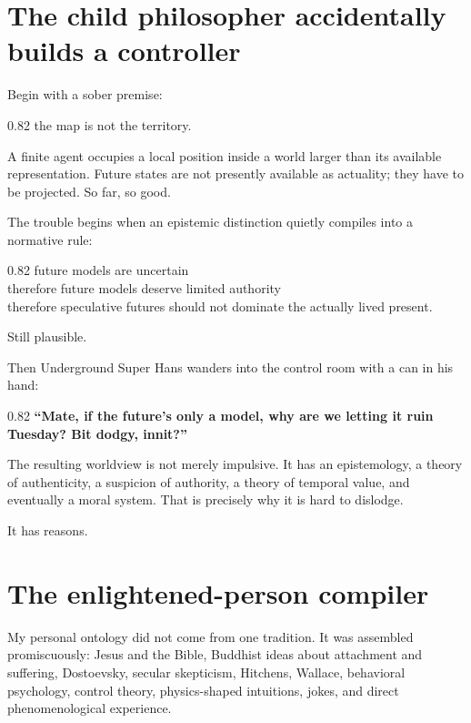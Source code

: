 \documentclass[10pt,letterpaper]{article}
\newenvironment{paperbody}
  {\begingroup\justifying}
  {\par\endgroup}
\newenvironment{voicebox}
  {\Needspace{3.5\baselineskip}\par\vspace{0.22em}\begin{center}\begingroup
   \begin{lrbox}{\voiceboxsave}\begin{varwidth}{0.82\linewidth}
   \small\rmfamily\upshape\RaggedRight}
  {\end{varwidth}\end{lrbox}\fbox{\usebox{\voiceboxsave}}
   \endgroup\end{center}\vspace{0.22em}}
\let\oldsection\section
\renewcommand{\section}{\Needspace{6\baselineskip}\oldsection}
\begin{document}
\begin{paperbody}
\section{The child philosopher accidentally builds a
controller}\label{the-child-philosopher-accidentally-builds-a-controller}

Begin with a sober premise:

\begin{voicebox}
the map is not the territory.
\end{voicebox}

A finite agent occupies a local position inside a world larger than its
available representation. Future states are not presently available as
actuality; they have to be projected. So far, so good.

The trouble begins when an epistemic distinction quietly compiles into a
normative rule:

\begin{voicebox}
future models are uncertain\\
therefore future models deserve limited authority\\
therefore speculative futures should not dominate the actually lived
present.
\end{voicebox}

Still plausible.

Then Underground Super Hans wanders into the control room with a can in
his hand:

\begin{voicebox}
\textbf{``Mate, if the future's only a model, why are we letting it ruin
Tuesday? Bit dodgy, innit?''}
\end{voicebox}

The resulting worldview is not merely impulsive. It has an epistemology,
a theory of authenticity, a suspicion of authority, a theory of temporal
value, and eventually a moral system. That is precisely why it is hard
to dislodge.

It has reasons.

\section{The enlightened-person
compiler}\label{the-enlightened-person-compiler}

My personal ontology did not come from one tradition. It was assembled
promiscuously: Jesus and the Bible, Buddhist ideas about attachment and
suffering, Dostoevsky, secular skepticism, Hitchens, Wallace, behavioral
psychology, control theory, physics-shaped intuitions, jokes, and direct
phenomenological experience.


\end{paperbody}
\end{document}
